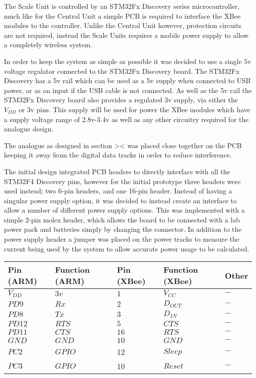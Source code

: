 The Scale Unit is controlled by an STM32Fx Discovery series microcontroller, much like for the Central Unit a simple PCB is required to interface the XBee modules to the controller.  Unlike the Central Unit however, protection circuits are not required, instead the Scale Units requires a mobile power supply to allow a completely wireless system.

In order to keep the system as simple as possible it was decided to use a single 5v voltage regulator connected to the STM32Fx Discovery board. The STM32Fx Discovery has a 5v rail which can be used as a 5v supply when connected to USB power, or as an input if the USB cable is not connected. As well as the 5v rail the STM32Fx Discovery board also provides a regulated 3v supply, via either the $V_{DD}$ or 3v pins. This supply will be used for power the XBee modules which have a supply voltage range of 2.8v-3.4v as well as any other circuitry required for the analogue design.

The analogue as designed in section >< was placed close together on the PCB keeping it away from the digital data tracks in order to reduce interference.

The initial design integrated PCB headers to directly interface with all the STM32F4 Discovery pins, however for the initial prototype three headers were used instead; two 6-pin headers, and one 16-pin header. Instead of having a singular power supply option, it was decided to instead create an interface to allow a number of different power supply options. This was implemented with a simple 2-pin molex header, which allows the board to be connected with a lab power pack and batteries simply by changing the connector. In addition to the power supply header a jumper was placed on the power tracks to measure the current being used by the system to allow accurate power usage to be calculated.

\begin{center}
  \begin{tabular}{| l | l | l | l | l |}
    \hline
    \bf{Pin (ARM)} & \bf{Function (ARM)} & \bf{Pin (XBee)} & \bf{Function (XBee)}  & \bf{Other}\\ \hline
         $V_{DD}$ & $3v $& $1 $& $V_{CC} $& $ - $\\ \hline
	 $PD9$ & \(Rx\) &$ 2$ &$ D_{OUT}$ &$ - $\\ \hline
	 $PD8 $& \(Tx\) &$ 3$ &$ D_{IN}$ & $- $\\ \hline
	 $PD12$ & \(RTS\) & $5$ & $CTS$ &$ - $ \\ \hline
	 $PD11$ & $CTS$ & $16$ & $RTS$ & $-$ \\ \hline
	 $GND$ & \(GND\) & $10$ & \(GND\) & $-$\\ \hline
	$PC2 $ & \(GPIO\) & 12 & \(Sleep\) & $-$\\ \hline
	$PC3 $ & \(GPIO\) & 10 & \(Reset\) & $-$ \\
    \hline
  \end{tabular}
\label{Pi2XBeeTable}
\end{center}